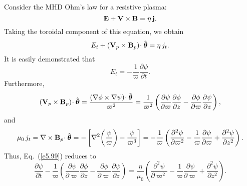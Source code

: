 Consider the MHD Ohm's law for a resistive plasma:
\begin{equation}\label{e5.98}
{\bf E} + {\bf V}\times{\bf B} =\eta\,{\bf j}.
\end{equation}
Taking the toroidal component of this equation, we obtain
\begin{equation}\label{e5.99}
E_t + ({\bf V}_p\times{\bf B}_p)\!\cdot \hat{\mbox{\boldmath$\theta$}}=\eta\, j_t.
\end{equation}
It is easily demonstrated that
\begin{equation}
E_t =-\frac{1}{\varpi}\frac{\partial\psi}{\partial t}.
\end{equation}
Furthermore,
\begin{equation}
({\bf V}_p\times{\bf B}_p)\!\cdot\hat{\mbox{\boldmath$\theta$}} =\frac{(\nabla\phi\times
\nabla\psi)\!\cdot \hat{\mbox{\boldmath$\theta$}}}{\varpi^2}=\frac{1}{\varpi^2}
\left(\frac{\partial\psi}{\partial\varpi}\frac{\partial\phi}{\partial z}
-\frac{\partial\phi}{\partial\varpi}\frac{\partial\psi}{\partial z}\right),
\end{equation}
and
\begin{equation}
\mu_0\,j_t = \nabla\times {\bf B}_p\!\cdot \hat{\mbox{\boldmath$\theta$}} =
-\left[\nabla^2\!\left(\frac{\psi}{\varpi}\right) -\frac{\psi}{\varpi^3}\right]
= -\frac{1}{\varpi}\left(\frac{\partial^2\psi}{\partial\varpi^2}-\frac{1}{\varpi}
\frac{\partial\psi}{\partial\varpi}+\frac{\partial^2\psi}{\partial z^2}\right).
\end{equation}
Thus,
Eq.~(\ref{e5.99}) reduces to
\begin{equation}
\frac{\partial\psi}{\partial t} - \frac{1}{\varpi}\left(\frac{\partial\psi}{\partial\varpi}\frac{\partial\phi}{\partial z}
-\frac{\partial\phi}{\partial\varpi}\frac{\partial\psi}{\partial z}\right)
= \frac{\eta}{\mu_0}\left(\frac{\partial^2\psi}{\partial\varpi^2}
-\frac{1}{\varpi}\frac{\partial\psi}{\partial\varpi}
+\frac{\partial^2\psi}{\partial z^2}\right).
\end{equation}

